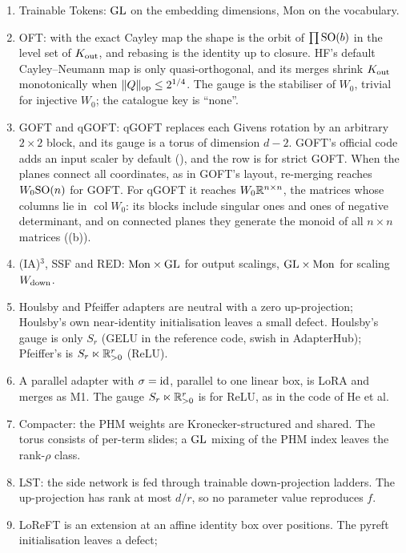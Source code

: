 {\begin{enumerate}[label={\sffamily\bfseries\color{tide}\arabic*},leftmargin=1.6em,itemsep=1pt,topsep=3pt]
  defect ($\approx$). The gauge gains one dimension for each sampled conjugate pair.
  \item Trainable Tokens: $\mathrm{GL}$ on the embedding dimensions, Mon on the vocabulary.
  \item OFT: with the exact Cayley map the shape is the orbit of $\prod\mathrm{SO}(b)$ in the level set of $K_{\rm out}$, and
  rebasing is the identity up to closure. HF's default Cayley--Neumann map is only quasi-orthogonal, and its merges
  shrink $K_{\rm out}$ monotonically when $\lVert Q\rVert_{\rm op}\le2^{1/4}$. The gauge is the stabiliser of $W_0$,
  trivial for injective $W_0$; the catalogue key is ``none''.
  \item GOFT and qGOFT: qGOFT replaces each Givens rotation by an arbitrary $2\times2$ block, and its gauge is a torus of
  dimension $d-2$. GOFT's official code adds an input scaler by default (), and the row is for
  strict GOFT. When the planes connect all coordinates, as in GOFT's layout, re-merging reaches $W_0\mathrm{SO}(n)$ for GOFT.
  For qGOFT it reaches $W_0\mathbb{R}^{n\times n}$, the matrices whose columns lie in $\operatorname{col}W_0$: its blocks
  include singular ones and ones of negative determinant, and on connected planes they generate the monoid of all
  $n\times n$ matrices ((b)).
  \item (IA)$^3$, SSF and RED: $\mathrm{Mon}\times\mathrm{GL}$ for output scalings, $\mathrm{GL}\times\mathrm{Mon}$ for scaling
  $W_{\rm down}$.
  \item Houlsby and Pfeiffer adapters are neutral with a zero up-projection; Houlsby's own near-identity initialisation
  leaves a small defect. Houlsby's gauge is only $S_r$ (GELU in the reference code, swish in AdapterHub); Pfeiffer's is
  $S_r\ltimes\mathbb{R}_{>0}^r$ (ReLU).
  \item A parallel adapter with $\sigma=\mathrm{id}$, parallel to one linear box, is LoRA and merges as M1. The gauge
  $S_r\ltimes\mathbb{R}^r_{>0}$ is for ReLU, as in the code of He et al.
  \item Compacter: the PHM weights are Kronecker-structured and shared. The torus consists of per-term slides; a $\mathrm{GL}$
  mixing of the PHM index leaves the rank-$\rho$ class.
  \item LST: the side network is fed through trainable down-projection ladders. The up-projection has rank at most
  $d/r$, so no parameter value reproduces $f$.
  \item LoReFT is an extension at an affine identity box over positions. The pyreft initialisation leaves a defect;

\end{enumerate}}
